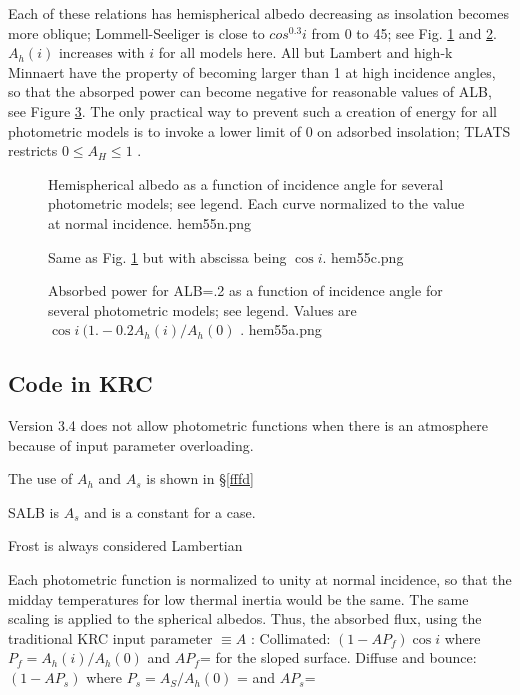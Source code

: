 Each of these relations has hemispherical albedo decreasing as insolation
becomes more oblique; Lommell-Seeliger is close to $cos^{0.3} i$ from 0 to
45\qd; see Fig. \ref{hem55n} and \ref{hem55c}. $A_h(i)$ increases with $i$ for
all models here. All but Lambert and high-k Minnaert have the property of
becoming larger than 1 at high incidence angles, so that the absorped power can
become negative for reasonable values of ALB, see Figure \ref{hem55a}. The only
practical way to prevent such a creation of energy for all photometric models is
to invoke a lower limit of 0 on adsorbed insolation; TLATS restricts $0 \le A_H \le 1$ .

\begin{figure}[!ht] 
\caption[Normalized Hemispherical Albedo]{Hemispherical albedo as a function of incidence 
angle for several photometric models; see legend. Each curve normalized to the 
value at normal incidence. %
\label{hem55n} hem55n.png }
\end{figure} 
\begin{figure}[!ht] 
\caption[Hemispherical Albedo]{Same as Fig. \ref{hem55n} but with abscissa being $\cos i$. 
\label{hem55c} hem55c.png }
\end{figure} 

\begin{figure}[!ht] 
\caption[Absorbed power]{Absorbed power for ALB=.2 as a function of incidence
 angle for several photometric models; see legend. 
Values are $\cos i \ (1.-0.2 A_h(i)/A_h(0)$ .
\label{hem55a}  hem55a.png }
\end{figure} 

\subsection{Code in KRC} %
Version 3.4 does not allow photometric functions when there is an atmosphere
because of input parameter overloading.

The use of $A_h$ and $A_s$ is shown in \S \ref{fffd}

SALB is $A_s$ and is a constant for a case.

Frost is always considered Lambertian

Each photometric function is normalized to unity at normal incidence, so that
the midday temperatures for low thermal inertia would be the same. The same
scaling is applied to the spherical albedos. Thus, the absorbed flux, using the
traditional KRC input parameter $\equiv A$ :
\qi Collimated: $(1-A P_f) \cos i$ where $P_f = A_h(i)/A_h(0)$ and 
$A P_f$= for the sloped surface.
\qi Diffuse and bounce: $(1-A P_s)$ where $P_s = A_S/A_h(0)$ =  and 
$A P_s$=

